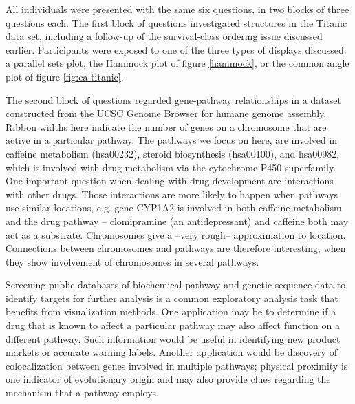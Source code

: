  All individuals were presented with the same six questions, in two blocks of three questions each. The first block of questions investigated structures in the Titanic data set, including a follow-up of the survival-class ordering issue discussed earlier. Participants were exposed to one of the three types of displays discussed: a parallel sets plot, the Hammock plot of figure \ref{hammock}, or the common angle plot of  figure \ref{fig:ca-titanic}.
 
The second block  of questions regarded gene-pathway relationships in a dataset constructed from the UCSC Genome Browser \cite{ucsc:2002} for humane genome assembly. Ribbon widths here indicate the number of genes on a  chromosome that are active in a particular pathway. The pathways we focus on here, are involved in caffeine metabolism (hsa00232),  steroid biosynthesis (hsa00100), and hsa00982, which is involved with drug metabolism via the cytochrome P450 superfamily.  One important question when dealing with drug development are interactions with other drugs. Those interactions are more likely to happen when pathways use similar locations, e.g. gene CYP1A2 is involved in both  caffeine metabolism and the drug pathway -- clomipramine (an antidepressant) and caffeine both may act as a substrate. Chromosomes give a --very rough-- approximation to location. Connections between chromosomes and pathways are therefore interesting, when they show involvement of chromosomes in several pathways.
 


Screening public databases of biochemical pathway and genetic sequence data to identify targets for further analysis is a common exploratory analysis task that benefits from visualization methods. One application may be to determine if a drug that is known to affect a particular pathway may also affect function on a different pathway. Such information would be useful in identifying new product markets or accurate warning labels. Another application would be discovery of colocalization between genes involved in multiple pathways; physical proximity is one indicator of evolutionary origin and may also provide clues regarding the mechanism that a pathway employs.
 
